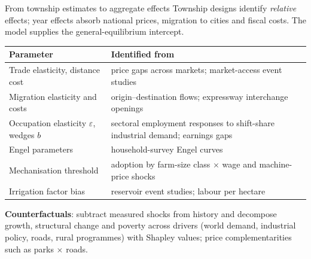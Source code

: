 \documentclass[10pt,aspectratio=169]{beamer}
\newcommand{\hl}[1]{\textcolor{mOrange}{#1}}
\begin{document}
\begin{frame}{From township estimates to aggregate effects}
  \small
  Township designs identify \emph{relative} effects; year effects absorb national prices,
  migration to cities and fiscal costs. The model supplies the general-equilibrium
  \hl{intercept}.
  \vspace{0.3em}

  \footnotesize
  \begin{tabular}{@{}L{0.33\textwidth}L{0.6\textwidth}@{}}
    \toprule
    Parameter & Identified from \\
    \midrule
    Trade elasticity, distance cost & price gaps across markets; market-access event studies \\
    Migration elasticity and costs & origin--destination flows; expressway interchange openings \\
    Occupation elasticity $\varepsilon$, wedges $b$ & sectoral employment responses to
      shift-share industrial demand; earnings gaps \\
    Engel parameters & household-survey Engel curves \\
    Mechanisation threshold & adoption by farm-size class $\times$ wage and machine-price shocks \\
    Irrigation factor bias & reservoir event studies; labour per hectare \\
    \bottomrule
  \end{tabular}
  \vspace{0.4em}

  \small
  \textbf{Counterfactuals}: subtract measured shocks from history and decompose growth,
  structural change and \hl{poverty} across drivers (world demand, industrial policy,
  roads, rural programmes) with Shapley values; price complementarities such as
  parks $\times$ roads.
\end{frame}
\end{document}
